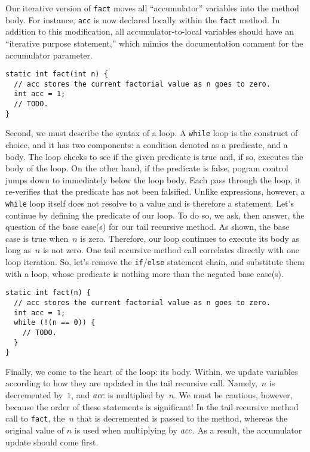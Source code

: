 Our iterative version of \texttt{fact} moves all ``accumulator'' variables into the method body. 
For instance, \texttt{acc} is now declared locally within the \texttt{fact} method. 
In addition to this modification, all accumulator-to-local variables should have an ``iterative purpose statement,'' which mimics the documentation comment for the accumulator parameter.

\begin{lstlisting}[language=MyJava]
static int fact(int n) {
  // acc stores the current factorial value as n goes to zero.
  int acc = 1;
  // TODO.
}
\end{lstlisting}

Second, we must describe the syntax of a loop. 
A \texttt{while} loop is the construct of choice, and it has two components: a condition denoted as a predicate, and a body. 
The loop checks to see if the given predicate is true and, if so, executes the body of the loop. 
On the other hand, if the predicate is false, pogram control jumps down to immediately below the loop body. 
Each pass through the loop, it re-verifies that the predicate has not been falsified. 
Unlike expressions, however, a \texttt{while} loop itself does not resolve to a value and is therefore a statement. 
Let's continue by defining the predicate of our loop. 
To do so, we ask, then answer, the question of the base case(s) for our tail recursive method. 
As shown, the base case is true when~$n$ is zero. 
Therefore, our loop continues to execute its body as long as~$n$ is not zero. 
One tail recursive method call correlates directly with one loop iteration. 
So, let's remove the \texttt{if}/\texttt{else} statement chain, and substitute them with a loop, whose predicate is nothing more than the negated base case(s).

\begin{lstlisting}[language=MyJava]
static int fact(n) {
  // acc stores the current factorial value as n goes to zero.
  int acc = 1;
  while (!(n == 0)) {
    // TODO.
  }
}
\end{lstlisting}

Finally, we come to the heart of the loop: its body.
Within, we update variables according to how they are updated in the tail recursive call. 
Namely,~$n$ is decremented by~$1$, and $\emph{acc}$ is multiplied by~$n$. 
We must be cautious, however, because the order of these statements is significant! 
In the tail recursive method call to \texttt{fact}, the~$n$ that is decremented is passed to the method, whereas the original value of $n$ is used when multiplying by $\emph{acc}$. As a result, the accumulator update should come first.

